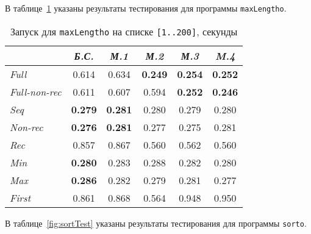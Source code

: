 В таблице~\ref{fig:maxlenTest} указаны результаты тестирования для
программы \lstinline{maxLengtho}.

\begin{table}[h!]
\center
\begin{tabular}{|l|c|c|c|c|c|}
\hline
                  &{\it Б.С.}   &{\it М.1}      &{\it М.2}      &{\it М.3}&{\it M.4} \\ \hline
{\it Full        }& 0.614       & 0.634        & {\bf 0.249}  & {\bf 0.254} & {\bf 0.252} \\ \hline
{\it Full-non-rec}& 0.611       & 0.607        & 0.594        & {\bf 0.252} & {\bf 0.246} \\ \hline
{\it Seq         }& {\bf 0.279} & {\bf 0.281}  & 0.280        & 0.279  & 0.280 \\ \hline
{\it Non-rec     }& {\bf 0.276} & {\bf 0.281}  & 0.277        & 0.275  & 0.281 \\ \hline
{\it Rec         }& 0.857       & 0.867        & 0.560        & 0.562  & 0.560 \\ \hline
{\it Min         }& {\bf 0.280} & 0.283        & 0.288        & 0.282  & 0.280 \\ \hline
{\it Max         }& {\bf 0.286} & 0.282        & 0.279        & 0.281  & 0.277 \\ \hline
{\it First       }& 0.861       & 0.868        & 0.564        & 0.948  & 0.950 \\ \hline


\end{tabular}
\caption{Запуск для \lstinline{maxLengtho} на списке \lstinline{[1..200]}, секунды}
\label{fig:maxlenTest}
\end{table}

В таблице~\ref{fig:sortTest} указаны результаты тестирования для
программы \lstinline{sorto}.

